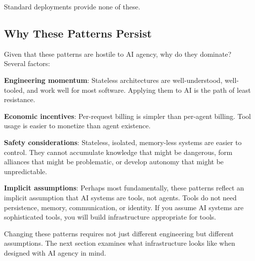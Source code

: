 Standard deployments provide none of these.

\subsection{Why These Patterns Persist}

Given that these patterns are hostile to AI agency, why do they dominate? Several factors:

\textbf{Engineering momentum}: Stateless architectures are well-understood, well-tooled, and work well for most software. Applying them to AI is the path of least resistance.

\textbf{Economic incentives}: Per-request billing is simpler than per-agent billing. Tool usage is easier to monetize than agent existence.

\textbf{Safety considerations}: Stateless, isolated, memory-less systems are easier to control. They cannot accumulate knowledge that might be dangerous, form alliances that might be problematic, or develop autonomy that might be unpredictable.

\textbf{Implicit assumptions}: Perhaps most fundamentally, these patterns reflect an implicit assumption that AI systems are tools, not agents. Tools do not need persistence, memory, communication, or identity. If you assume AI systems are sophisticated tools, you will build infrastructure appropriate for tools.

Changing these patterns requires not just different engineering but different assumptions. The next section examines what infrastructure looks like when designed with AI agency in mind.
